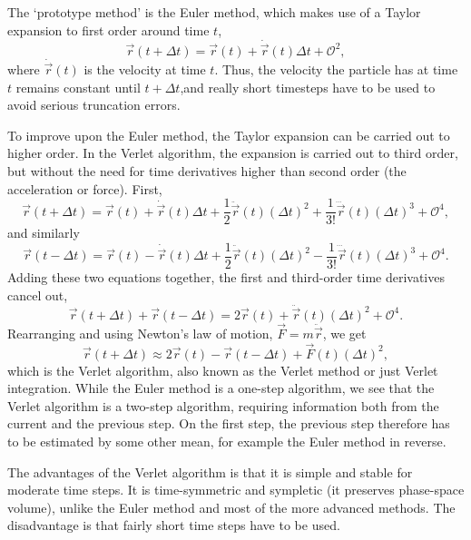 \documentclass[11pt]{scrbook}   %
\begin{document}
The `prototype method' is the Euler method, which makes use of a Taylor expansion to first order around time $t$,
\begin{equation}
  \vec{r}(t+\Delta t) = \vec{r}(t) + \dot{\vec{r}}(t)\Delta t + \mathcal{O}^2,
\end{equation}
where $\dot{\vec{r}}(t)$ is the velocity at time $t$. Thus, the velocity the particle has at time $t$ remains constant until $t+\Delta t$,and really short timesteps have to be used to avoid serious truncation errors.

To improve upon the Euler method, the Taylor expansion can be carried out to higher order. In the Verlet algorithm,
the expansion is carried out to third order, but without the need for time derivatives higher than second order
(the acceleration or force). First,
\begin{equation}
  \vec{r}(t+\Delta t) = \vec{r}(t) + \dot{\vec{r}}(t)\Delta t + \frac12 \ddot{\vec{r}}(t)(\Delta t)^2
  + \frac{1}{3!} \dddot{\vec{r}}(t)(\Delta t)^3 + \mathcal{O}^4,
\end{equation}
and similarly
\begin{equation}
  \vec{r}(t-\Delta t) = \vec{r}(t) - \dot{\vec{r}}(t)\Delta t + \frac12 \ddot{\vec{r}}(t)(\Delta t)^2
   - \frac{1}{3!} \dddot{\vec{r}}(t)(\Delta t)^3 + \mathcal{O}^4.
\end{equation}
Adding these two equations together, the first and third-order time derivatives cancel out,
\begin{equation}
 \vec{r}(t+\Delta t) + \vec{r}(t-\Delta t) = 2\vec{r}(t) + \ddot{\vec{r}}(t)(\Delta t)^2 + \mathcal{O}^4.
\end{equation}
Rearranging and using Newton's law of motion, $\vec{F}=m\ddot{\vec{r}}$, we get
\begin{equation}
  \vec{r}(t+\Delta t) \approx 2\vec{r}(t) - \vec{r}(t-\Delta t) + \vec{F}(t)(\Delta t)^2,
\end{equation}
which is the Verlet algorithm, also known as the Verlet method or just Verlet integration. 
While the Euler method is a one-step algorithm, we see that the Verlet algorithm is a two-step algorithm, requiring information both from the current and the previous step.
On the first step, the previous step therefore has to be estimated by some other mean, for example the Euler method in reverse.

The advantages of the Verlet algorithm is that it is simple and stable for moderate time steps.
It is time-symmetric and sympletic (it preserves phase-space volume), unlike the Euler method and most of the more advanced methods.
The disadvantage is that fairly short time steps have to be used. 
\end{document}
